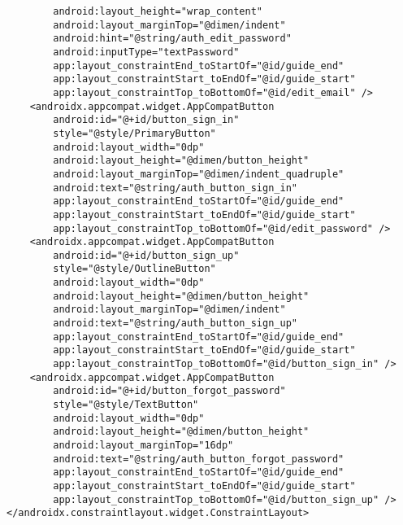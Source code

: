 \documentclass[listing]{espd}
\begin{document}
\begin{verbatim}
        android:layout_height="wrap_content"
        android:layout_marginTop="@dimen/indent"
        android:hint="@string/auth_edit_password"
        android:inputType="textPassword"
        app:layout_constraintEnd_toStartOf="@id/guide_end"
        app:layout_constraintStart_toEndOf="@id/guide_start"
        app:layout_constraintTop_toBottomOf="@id/edit_email" />
    <androidx.appcompat.widget.AppCompatButton
        android:id="@+id/button_sign_in"
        style="@style/PrimaryButton"
        android:layout_width="0dp"
        android:layout_height="@dimen/button_height"
        android:layout_marginTop="@dimen/indent_quadruple"
        android:text="@string/auth_button_sign_in"
        app:layout_constraintEnd_toStartOf="@id/guide_end"
        app:layout_constraintStart_toEndOf="@id/guide_start"
        app:layout_constraintTop_toBottomOf="@id/edit_password" />
    <androidx.appcompat.widget.AppCompatButton
        android:id="@+id/button_sign_up"
        style="@style/OutlineButton"
        android:layout_width="0dp"
        android:layout_height="@dimen/button_height"
        android:layout_marginTop="@dimen/indent"
        android:text="@string/auth_button_sign_up"
        app:layout_constraintEnd_toStartOf="@id/guide_end"
        app:layout_constraintStart_toEndOf="@id/guide_start"
        app:layout_constraintTop_toBottomOf="@id/button_sign_in" />
    <androidx.appcompat.widget.AppCompatButton
        android:id="@+id/button_forgot_password"
        style="@style/TextButton"
        android:layout_width="0dp"
        android:layout_height="@dimen/button_height"
        android:layout_marginTop="16dp"
        android:text="@string/auth_button_forgot_password"
        app:layout_constraintEnd_toStartOf="@id/guide_end"
        app:layout_constraintStart_toEndOf="@id/guide_start"
        app:layout_constraintTop_toBottomOf="@id/button_sign_up" />
</androidx.constraintlayout.widget.ConstraintLayout>
\end{verbatim}
\end{document}
